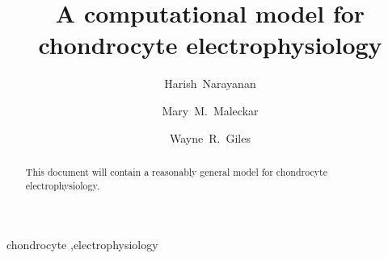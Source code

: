 \begin{frontmatter}

\title{A computational model for chondrocyte electrophysiology}

\author[srl]{Harish~Narayanan}
\author[srl]{Mary~M.~Maleckar}
\author[ucal]{Wayne~R.~Giles}

\address[srl]{Center for Biomedical Computing, Simula Research
  Laboratory, P.O.~Box~134, 1325~Lysaker, Norway}

\address[ucal]{Faculty of Kinesiology, University of Calgary, Calgary,
  Alberta, Canada T2N 4N1}

\begin{abstract}
  This document will contain a reasonably general model for
  chondrocyte electrophysiology.
\end{abstract}

\begin{keyword}
chondrocyte \sep electrophysiology
\end{keyword}

\end{frontmatter}


